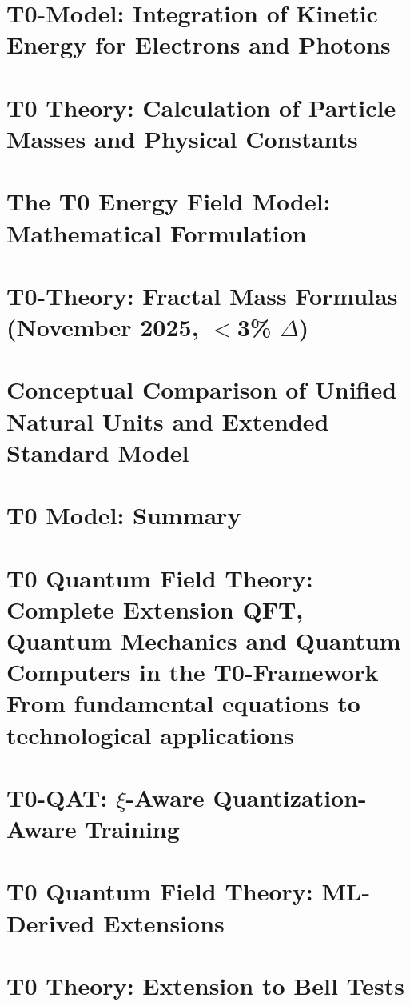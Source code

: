 	\chapter{T0-Model: Integration of Kinetic Energy for Electrons and Photons}
	
	\chapter{T0 Theory: Calculation of Particle Masses and Physical Constants}
	
	\chapter{The T0 Energy Field Model: Mathematical Formulation}
	
	\chapter{T0-Theory: Fractal Mass Formulas (November 2025, $<$3\% $\Delta$)}
	
	\chapter{Conceptual Comparison of Unified Natural Units and Extended Standard Model}
	
	\chapter{T0 Model: Summary}
	
	\chapter{T0 Quantum Field Theory: Complete Extension QFT, Quantum Mechanics and Quantum Computers in the T0-Framework From fundamental equations to technological applications}
	
	\chapter{T0-QAT: $\xi$-Aware Quantization-Aware Training}
	
	\chapter{T0 Quantum Field Theory: ML-Derived Extensions}
	
	\chapter{T0 Theory: Extension to Bell Tests}
	
